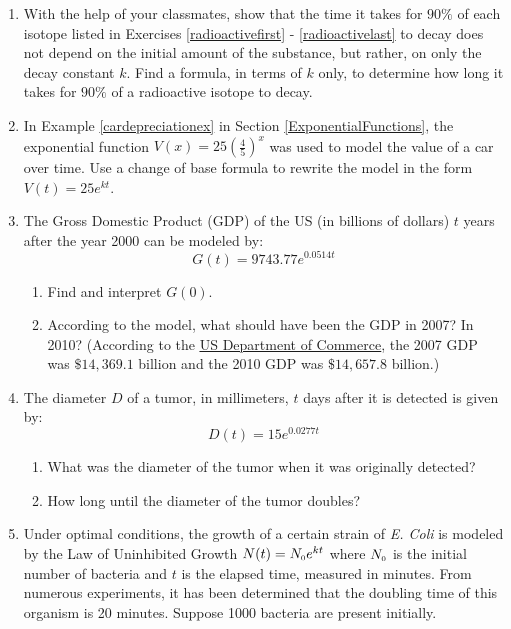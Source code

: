 \documentclass{ximera}
\begin{document}
\begin{enumerate}
\setcounter{enumi}{\value{HW}}

\item With the help of your classmates, show that the time it takes for $90 \%$ of each isotope listed in Exercises \ref{radioactivefirst} - \ref{radioactivelast} to decay does not depend on the initial amount of the substance, but rather, on only the decay constant $k$. Find a formula, in terms of $k$ only, to determine how long it takes for $90 \%$ of a radioactive isotope to decay. 


\item In Example \ref{cardepreciationex} in Section \ref{ExponentialFunctions}, the exponential function $V(x) = 25 \left(\frac{4}{5}\right)^{x}$ was used to model the value of a car over time.  Use a change of base formula to rewrite the model in the form $V(t) = 25e^{kt}$.

\item  The Gross Domestic Product (GDP) of the US (in billions of dollars) $t$ years after the year 2000 can be modeled by: \[ G(t) = 9743.77 e^{0.0514t}\]

\begin{enumerate}

\item  Find and interpret $G(0)$.

\item  According to the model, what should have been the GDP in 2007?  In 2010?  (According to the   \href{http://1.usa.gov/iimT40}{\underline{US Department of Commerce}}, the 2007 GDP was $\$14,369.1$ billion and the 2010 GDP was $\$14,657.8$ billion.)

\end{enumerate}

\item  The diameter $D$ of a tumor, in millimeters, $t$ days after it is detected is given by:  \[D(t) = 15e^{0.0277t} \]

\begin{enumerate}

\item  What was the diameter of the tumor when it was originally detected?

\item  How long until the diameter of the tumor doubles?

\end{enumerate}

\item  Under optimal conditions, the growth of a certain strain of \textit{E. Coli} is modeled by the Law of Uninhibited Growth $N(t) = N_{\text{\tiny $0$}} e^{kt}$ where $N_{\text{\tiny $0$}}$ is the initial number of bacteria and $t$ is the elapsed time, measured in minutes. From numerous experiments, it has been determined that the doubling time of this organism is 20 minutes. Suppose 1000 bacteria are present initially.


\end{enumerate}
\end{document}
